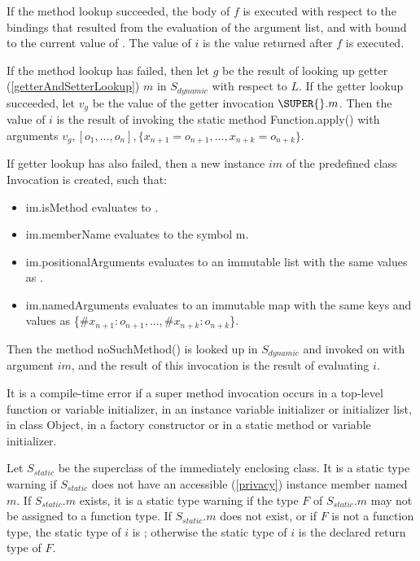 \documentclass{article}
\newcommand{\code}[1]{{\sf #1}}
\begin{document}
\LMHash{}
If the method lookup succeeded, the body of $f$ is executed with respect to the bindings that resulted from the evaluation of the argument list, and with \THIS{} bound to the current value of \THIS{}. The value of $i$ is the value returned after $f$ is executed.

\LMHash{}
If the method lookup has failed, then let $g$ be the result of looking up getter (\ref{getterAndSetterLookup}) $m$ in $S_{dynamic}$ with respect to $L$. If the getter lookup succeeded, let $v_g$ be the value of the getter invocation $\SUPER{}.m$. Then the value of $i$ is the result of invoking
the static method \code{Function.apply()} with arguments $v_g, [o_1, \ldots , o_n], \{x_{n+1} = o_{n+1}, \ldots , x_{n+k} = o_{n+k}\}$.

\LMHash{}
If  getter lookup has also failed, then a new instance $im$  of the predefined class \code{Invocation} is created, such that:
\begin{itemize}
\item \code{im.isMethod} evaluates to \code{\TRUE{}}.
\item \code{im.memberName} evaluates to the symbol \code{m}.
\item \code{im.positionalArguments} evaluates to an immutable list with the same  values as  \code{[$o_1, \ldots, o_n$]}.
\item \code{im.namedArguments} evaluates to an immutable map with the same keys and values as \code{\{$\#x_{n+1}: o_{n+1}, \ldots, \#x_{n+k} : o_{n+k}$\}}.
\end{itemize}
Then the method \code{noSuchMethod()} is looked up in $S_{dynamic}$ and invoked on \THIS{} with argument $im$, and the result of this invocation is the result of evaluating $i$.

\LMHash{}
It is a compile-time error if a super method invocation occurs in a top-level function or variable initializer, in an instance variable initializer or initializer list, in class \code{Object}, in a factory constructor or in a static method or variable initializer.

\LMHash{}
Let $S_{static}$ be the superclass of the immediately enclosing class. It is a static type warning if $S_{static}$ does not have an accessible (\ref{privacy}) instance member named $m$. If $S_{static}.m$ exists, it  is a static type warning if the type $F$ of $S_{static}.m$ may not be assigned to a function type. If $S_{static}.m$ does not exist, or if $F$ is not a function type, the static type of $i$ is \DYNAMIC{}; otherwise the static type of $i$ is the declared return type of  $F$.
\end{document}
